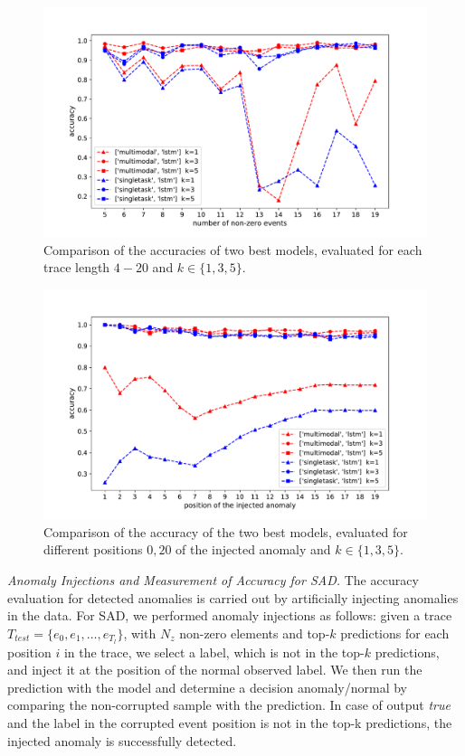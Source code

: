\begin{figure}[htbp]
\centerline{\includegraphics[width=1.0\textwidth]{gfx/chap5/groupbykn.pdf}}
\caption{Comparison of the accuracies of two best models, evaluated for each trace length \(4-20\)
and $k \in \{1, 3, 5\}$.}
\label{kn}
\end{figure}

\begin{figure}[htbp]
\centerline{\includegraphics[width=1.0\textwidth]{gfx/chap5/groupbykidx.pdf}}
\caption{Comparison of the accuracy of the two best models, evaluated for different positions \(0, 20\) of the injected anomaly and $k \in \{1, 3, 5\}$.}
\label{kidx}
\end{figure}

\emph{Anomaly Injections and Measurement of Accuracy for SAD.} The accuracy evaluation for detected anomalies is carried out by artificially injecting anomalies in the data. For SAD, we performed anomaly injections as follows: given a trace $T_{test} = \{e_0, e_1, \dots, e_{T_l}\}$, with $N_z$ non-zero elements and top-$k$ predictions for each position $i$ in the trace, we select a label, which is not in the top-$k$ predictions, and inject it at the position of the normal observed label. We then run the prediction with the model and determine a decision anomaly/normal by comparing the non-corrupted sample with the prediction. In case of output \textit{true} and the label in the corrupted event position is not in the top-k predictions, the injected anomaly is successfully detected.

